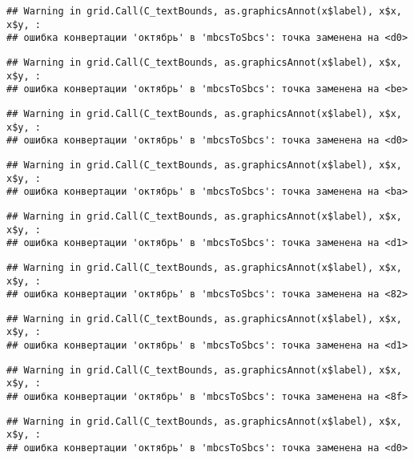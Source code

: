 \documentclass[
]{article}
\begin{document}
\begin{verbatim}
## Warning in grid.Call(C_textBounds, as.graphicsAnnot(x$label), x$x, x$y, :
## ошибка конвертации 'октябрь' в 'mbcsToSbcs': точка заменена на <d0>
\end{verbatim}

\begin{verbatim}
## Warning in grid.Call(C_textBounds, as.graphicsAnnot(x$label), x$x, x$y, :
## ошибка конвертации 'октябрь' в 'mbcsToSbcs': точка заменена на <be>
\end{verbatim}

\begin{verbatim}
## Warning in grid.Call(C_textBounds, as.graphicsAnnot(x$label), x$x, x$y, :
## ошибка конвертации 'октябрь' в 'mbcsToSbcs': точка заменена на <d0>
\end{verbatim}

\begin{verbatim}
## Warning in grid.Call(C_textBounds, as.graphicsAnnot(x$label), x$x, x$y, :
## ошибка конвертации 'октябрь' в 'mbcsToSbcs': точка заменена на <ba>
\end{verbatim}

\begin{verbatim}
## Warning in grid.Call(C_textBounds, as.graphicsAnnot(x$label), x$x, x$y, :
## ошибка конвертации 'октябрь' в 'mbcsToSbcs': точка заменена на <d1>
\end{verbatim}

\begin{verbatim}
## Warning in grid.Call(C_textBounds, as.graphicsAnnot(x$label), x$x, x$y, :
## ошибка конвертации 'октябрь' в 'mbcsToSbcs': точка заменена на <82>
\end{verbatim}

\begin{verbatim}
## Warning in grid.Call(C_textBounds, as.graphicsAnnot(x$label), x$x, x$y, :
## ошибка конвертации 'октябрь' в 'mbcsToSbcs': точка заменена на <d1>
\end{verbatim}

\begin{verbatim}
## Warning in grid.Call(C_textBounds, as.graphicsAnnot(x$label), x$x, x$y, :
## ошибка конвертации 'октябрь' в 'mbcsToSbcs': точка заменена на <8f>
\end{verbatim}

\begin{verbatim}
## Warning in grid.Call(C_textBounds, as.graphicsAnnot(x$label), x$x, x$y, :
## ошибка конвертации 'октябрь' в 'mbcsToSbcs': точка заменена на <d0>
\end{verbatim}
\end{document}
